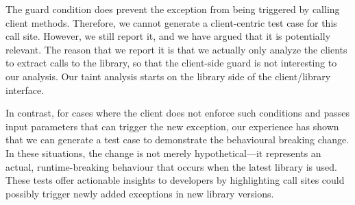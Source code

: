 The guard condition does prevent the exception from being triggered by calling client methods. Therefore, we cannot generate a client-centric test case for this call site. However, we still report it, and we have argued that it is potentially relevant. The reason that we report it is that we actually only analyze the clients to extract calls to the library, so that the client-side guard is not interesting to our analysis. Our taint analysis starts on the library side of the client/library interface.

In contrast, for cases where the client does not enforce such conditions and passes input parameters that can trigger the new exception, our experience has shown that we can generate a test case to demonstrate the behavioural breaking change. In these situations, the change is not merely hypothetical—it represents an actual, runtime-breaking behaviour that occurs when the latest library is used. These tests offer actionable insights to developers by highlighting call sites could possibly trigger newly added exceptions in new library versions.


